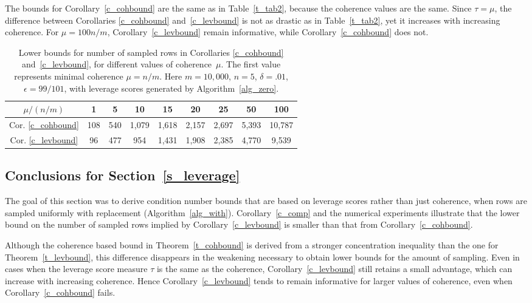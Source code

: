 \documentclass{siamltex}
\begin{document}
The bounds for Corollary~\ref{c_cohbound} are the same as in 
Table~\ref{t_tab2}, because the coherence values are the same.
Since $\tau=\mu$, the difference between Corollaries \ref{c_cohbound}
and~\ref{c_levbound} is not as drastic as in Table~\ref{t_tab2}, yet
it increases with increasing coherence. For $\mu=100n/m$,
Corollary~\ref{c_levbound} remain informative, while
Corollary~\ref{c_cohbound} does not.

\begin{table}
\begin{center}
\begin{tabular}{|c||c|c|c|c|c|c|c|c|}
\hline
$\mu/(n/m)$ & 1 & 5 & 10 & 15 & 20 &25 &50& 100\\
\hline\hline 
Cor. \ref{c_cohbound} & 108 & 540 & 1,079 & 1,618 & 2,157&2,697 &5,393&10,787\\
Cor. \ref{c_levbound}& 96 & 477 & 954 & 1,431 & 1,908 &2,385 &4,770 & 9,539\\
\hline
\end{tabular}
\end{center}
\bigskip
\caption{Lower bounds for number of sampled rows
in Corollaries \ref{c_cohbound} and~\ref{c_levbound},
for different values of coherence~$\mu$.  
The first value represents minimal coherence $\mu=n/m$.
Here $m=10,000$, $n=5$, $\delta=.01$, $\epsilon=99/101$, with
leverage scores generated by Algorithm~\ref{alg_zero}.}\label{t_tab3}
\end{table}

\subsection{Conclusions for Section~\ref{s_leverage}}\label{s_lqconc}
The goal of this section was to derive condition number
bounds that are based on leverage scores
rather than just coherence, when rows are sampled uniformly with replacement 
(Algorithm~\ref{alg_with}).
Corollary~\ref{c_comp} and the numerical experiments illustrate that 
the lower bound on the number of sampled rows
implied by Corollary~\ref{c_levbound} is smaller than that from
Corollary~\ref{c_cohbound}. 

Although the coherence based bound in Theorem~\ref{t_cohbound}
is derived from a stronger concentration inequality than 
the one for Theorem~\ref{t_levbound},
this difference disappears in the weakening necessary to obtain 
lower bounds for the amount of sampling.  Even in cases when 
the leverage score measure $\tau$ is the same as the coherence,
Corollary~\ref{c_levbound} still retains a small advantage, which 
can increase with
increasing coherence. Hence Corollary~\ref{c_levbound} tends to remain 
informative
for larger values of coherence, even when Corollary~\ref{c_cohbound} fails.
\end{document}
